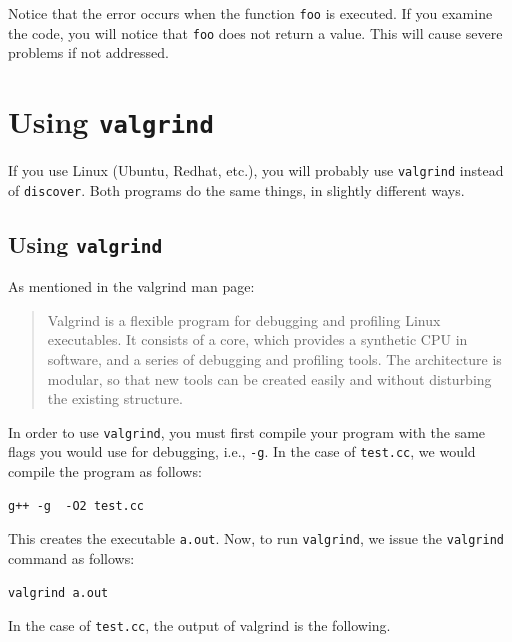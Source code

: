 \documentclass[12pt]{article}
\begin{document}
Notice that the error occurs when the function \verb+foo+ is
executed.   If you examine the code, you will notice that
\verb+foo+ does not return a value.   This will cause severe problems
if not addressed.

\section{Using {\tt valgrind} }
If you use Linux (Ubuntu, Redhat, etc.), you will probably use \verb+valgrind+
instead of \verb+discover+.  Both programs do the same things, in slightly different ways.

\subsection{Using {\tt valgrind}}
As mentioned in the valgrind man page:
\begin{quote}
Valgrind is a flexible program for debugging and profiling Linux
executables. It consists of a core, which provides a synthetic CPU in
software, and a series of debugging and profiling tools. The
architecture is modular, so that new tools can be created easily and
without disturbing the existing structure.
\end{quote}
In order to use \verb+valgrind+, you must first compile your program
with the same flags you would use for debugging, i.e., \verb+-g+.
In the case of \verb+test.cc+, we would compile the program
as follows:
\begin{verbatim}
g++ -g  -O2 test.cc
\end{verbatim}
This creates the executable \verb+a.out+. 
Now, to run \verb+valgrind+, we issue the \verb+valgrind+ command as follows:
\begin{verbatim}
valgrind a.out
\end{verbatim}
In the case of \verb+test.cc+, the output of valgrind is the
following.
\end{document}
